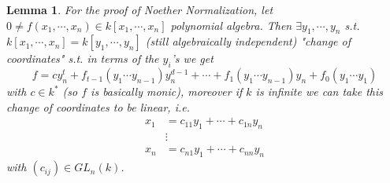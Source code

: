 \documentclass[11pt,a4paper]{article}
\theoremstyle{definition}
\theoremstyle{plain}
\newtheorem{lemma}[definition]{Lemma}
\theoremstyle{remark}
\begin{document}
\begin{lemma}
    For the proof of Noether Normalization, let $0 \ne f(x_1, \cdots, x_n) \in k[x_1, \cdots, x_n]$ 
    polynomial algebra. Then $\exists y_1, \cdots, y_n$ s.t. $k[x_1, \cdots, x_n] = k[y_1, \cdots, y_n]$ (still algebraically independent) 
    "change of coordinates" s.t. in terms of the $y_i$'s we get 
    $$f = c y_n^t + f_{t-1} (y_1 \cdots y_{n-1}) y_n^{d-1} + \cdots + f_1 (y_1 \cdots y_{n-1}) y_n + f_0 (y_1 \cdots y_1)$$
    with $c \in k^*$ (so $f$ is basically monic), moreover if $k$ is infinite we can take this change of coordinates to be linear, i.e. 
    \begin{align*}
        x_1 &= c_{11} y_1 + \cdots + c_{1n} y_n \\
        &\vdots \\
        x_n &= c_{n1} y_1 + \cdots + c_{nn} y_n
    \end{align*}    
    with $(c_{ij}) \in GL_n(k)$.
\end{lemma}
\end{document}
